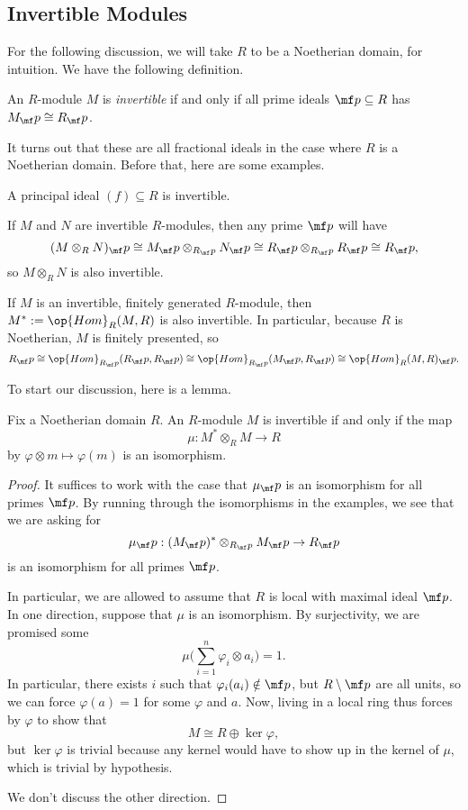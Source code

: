\subsection{Invertible Modules}
For the following discussion, we will take $R$ to be a Noetherian domain, for intuition. We have the following definition.
\begin{definition}
	An $R$-module $M$ is \textit{invertible} if and only if all prime ideals $\mf p\subseteq R$ has $M_\mf p\cong R_\mf p$.
\end{definition}
It turns out that these are all fractional ideals in the case where $R$ is a Noetherian domain. Before that, here are some examples.
\begin{example}
	A principal ideal $(f)\subseteq R$ is invertible.
\end{example}
\begin{example}
	If $M$ and $N$ are invertible $R$-modules, then any prime $\mf p$ will have
	\[(M\otimes_RN)_\mf p\cong M_\mf p\otimes_{R_\mf p}N_\mf p\cong R_\mf p\otimes_{R_\mf p}R_\mf p\cong R_\mf p,\]
	so $M\otimes_RN$ is also invertible.
\end{example}
\begin{example}
	If $M$ is an invertible, finitely generated $R$-module, then $M^*:=\op{Hom}_R(M,R)$ is also invertible. In particular, because $R$ is Noetherian, $M$ is finitely presented, so
	\[R_\mf p\cong\op{Hom}_{R_\mf p}(R_\mf p,R_\mf p)\cong\op{Hom}_{R_\mf p}(M_\mf p,R_\mf p)\cong\op{Hom}_R(M,R)_\mf p.\]
\end{example}
To start our discussion, here is a lemma.
\begin{lemma}
	Fix a Noetherian domain $R$. An $R$-module $M$ is invertible if and only if the map
	\[\mu:M^*\otimes_RM\to R\]
	by $\varphi\otimes m\mapsto\varphi(m)$ is an isomorphism.
\end{lemma}
\begin{proof}
	It suffices to work with the case that $\mu_\mf p$ is an isomorphism for all primes $\mf p$. By running through the isomorphisms in the examples, we see that we are asking for
	\[\mu_\mf p:(M_\mf p)^*\otimes_{R_\mf p}M_\mf p\to R_\mf p\]
	is an isomorphism for all primes $\mf p$.

	In particular, we are allowed to assume that $R$ is local with maximal ideal $\mf p$. In one direction, suppose that $\mu$ is an isomorphism. By surjectivity, we are promised some
	\[\mu\Bigg(\sum_{i=1}^n\varphi_i\otimes a_i\Bigg)=1.\]
	In particular, there exists $i$ such that $\varphi_i(a_i)\notin\mf p$, but $R\setminus\mf p$ are all units, so we can force $\varphi(a)=1$ for some $\varphi$ and $a$. Now, living in a local ring thus forces by $\varphi$ to show that
	\[M\cong R\oplus\ker\varphi,\]
	but $\ker\varphi$ is trivial because any kernel would have to show up in the kernel of $\mu$, which is trivial by hypothesis.

	We don't discuss the other direction.
\end{proof}
